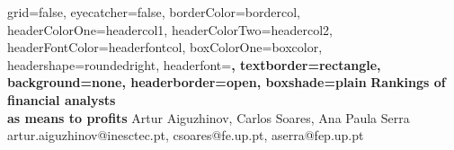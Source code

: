 \documentclass[a0paper,portrait]{baposter}\usepackage[]{graphicx}\usepackage[]{color}
\begin{document}


\begin{poster}{
	grid=false,
	eyecatcher=false,
	borderColor=bordercol,
	headerColorOne=headercol1,
	headerColorTwo=headercol2,
	headerFontColor=headerfontcol,
	boxColorOne=boxcolor,
	headershape=roundedright,
	headerfont=\Large\sf\bf,
	textborder=rectangle,
	background=none, %
	headerborder=open,
  boxshade=plain
}
{
}
{\sf\bf
	Rankings of financial analysts \\as means to profits
}
{
	\vspace{1em} Artur Aiguzhinov, Carlos Soares, Ana Paula Serra\\
	{\smaller artur.aiguzhinov@inesctec.pt, csoares@fe.up.pt, aserra@fep.up.pt}
}
{
\setlength\fboxsep{0pt}
\setlength\fboxrule{0.5pt}

}
\end{poster}
\end{document}
